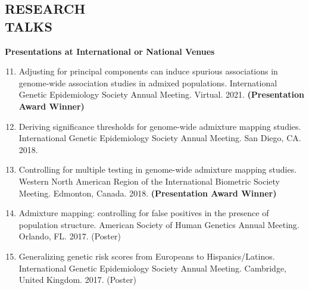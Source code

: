 \documentclass[margin]{res}
\newenvironment{benumerate}[1]{
    \let\oldItem\item
    \def\item{\addtocounter{enumi}{-2}\oldItem}
    
    \begin{enumerate}
    \setcounter{enumi}{#1}
    \addtocounter{enumi}{1}
}{
    \end{enumerate}
}
\begin{document}
\begin{resume}
%
%              


\section{RESEARCH \\TALKS}

\textbf{Presentations at International or National Venues}

\begin{benumerate}{10}

\item Adjusting for principal components can induce spurious associations in genome-wide association studies in admixed populations. International Genetic Epidemiology Society Annual Meeting. Virtual. 2021. \textbf{(Presentation Award Winner)}

\item %
Deriving significance thresholds for genome-wide admixture mapping studies. International Genetic Epidemiology Society Annual Meeting. San Diego, CA. 2018. 

\item %
Controlling for multiple testing in genome-wide admixture mapping studies. Western North American Region of the International Biometric Society Meeting. Edmonton, Canada. 2018. \textbf{(Presentation Award Winner)}

\item %
Admixture mapping: controlling for false positives in the presence of population structure. American Society of Human Genetics Annual Meeting. Orlando, FL. 2017. (Poster)

\item %
Generalizing genetic risk scores from Europeans to Hispanics/Latinos. International Genetic Epidemiology Society Annual Meeting. Cambridge, United Kingdom. 2017. (Poster)


\end{benumerate}
\end{resume}
\end{document}
